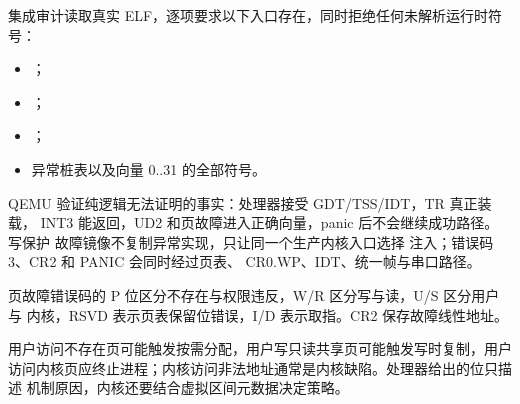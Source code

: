 集成审计读取真实 ELF，逐项要求以下入口存在，同时拒绝任何未解析运行时符号：
\begin{itemize}
  \item {}；
  \item {}；
  \item {}；
  \item 异常桩表以及向量 0..31 的全部符号。
\end{itemize}

QEMU 验证纯逻辑无法证明的事实：处理器接受 GDT/TSS/IDT，TR 真正装载，
INT3 能返回，UD2 和页故障进入正确向量，panic 后不会继续成功路径。写保护
故障镜像不复制异常实现，只让同一个生产内核入口选择
 注入；错误码 3、CR2 和 PANIC 会同时经过页表、
CR0.WP、IDT、统一帧与串口路径。

页故障错误码的 P 位区分不存在与权限违反，W/R 区分写与读，U/S 区分用户与
内核，RSVD 表示页表保留位错误，I/D 表示取指。CR2 保存故障线性地址。

用户访问不存在页可能触发按需分配，用户写只读共享页可能触发写时复制，用户
访问内核页应终止进程；内核访问非法地址通常是内核缺陷。处理器给出的位只描述
机制原因，内核还要结合虚拟区间元数据决定策略。
